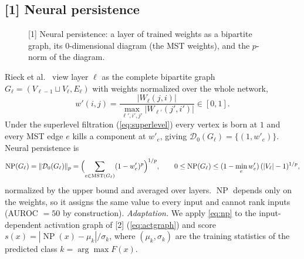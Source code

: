 \documentclass[11pt]{article}
\newcommand{\PD}{\mathcal{D}}
\newcommand{\NP}{\operatorname{NP}}
\begin{document}
\subsection{[1] Neural persistence}
\label{sec:np}
\begin{figure}[h]
\centering
{}
\caption{[1] Neural persistence: a layer of trained weights as a bipartite graph, its 0-dimensional
diagram (the MST weights), and the $p$-norm of the diagram.}
\label{fig:np}
\end{figure}
Rieck et al.\ \citep{rieck2019neural} view layer $\ell$ as the complete bipartite graph
$G_\ell=(V_{\ell-1}\sqcup V_\ell,E_\ell)$ with weights normalized over the whole network,
\begin{equation}
  w'(i,j) = \frac{|W_\ell(j,i)|}{\max_{\ell',i',j'}|W_{\ell'}(j',i')|}\in[0,1].
\end{equation}
Under the superlevel filtration (\cref{eq:superlevel}) every vertex is born at $1$ and every MST
edge $e$ kills a component at $w'_e$, giving $\PD_0(G_\ell)=\{(1,w'_e)\}$. Neural persistence is
\begin{equation}
  \NP(G_\ell) = \|\PD_0(G_\ell)\|_p = \Bigl(\sum_{e\in\mathrm{MST}(G_\ell)} (1-w'_e)^p\Bigr)^{1/p},
  \qquad 0\le \NP(G_\ell)\le (1-\min_e w'_e)\,(|V_\ell|-1)^{1/p},
  \label{eq:np}
\end{equation}
normalized by the upper bound and averaged over layers. $\NP$ depends only on the weights, so it
assigns the same value to every input and cannot rank inputs (AUROC $=50$ by construction).
\emph{Adaptation.} We apply \cref{eq:np} to the input-dependent activation graph of [2]
(\cref{eq:actgraph}) and score $s(x)=|\NP(x)-\mu_{k}|/\sigma_{k}$, where $(\mu_k,\sigma_k)$ are the
training statistics of the predicted class $k=\arg\max F(x)$.
\end{document}

